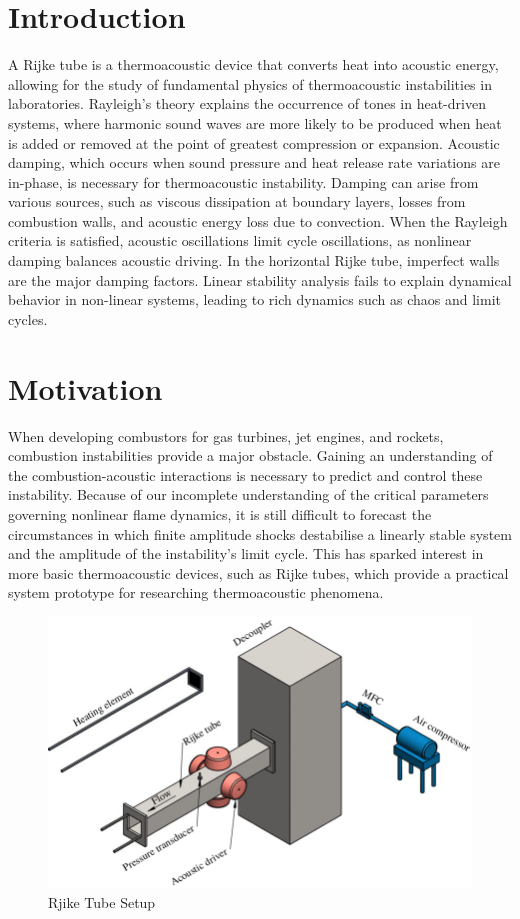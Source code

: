 \documentclass[8pt]{article} %
\begin{document}
\section{Introduction}
A Rijke tube is a thermoacoustic device that converts heat into acoustic energy, allowing for the study of fundamental physics of thermoacoustic instabilities in laboratories. Rayleigh's theory explains the occurrence of tones in heat-driven systems, where harmonic sound waves are more likely to be produced when heat is added or removed at the point of greatest compression or expansion. Acoustic damping, which occurs when sound pressure and heat release rate variations are in-phase, is necessary for thermoacoustic instability. Damping can arise from various sources, such as viscous dissipation at boundary layers, losses from combustion walls, and acoustic energy loss due to convection. When the Rayleigh criteria is satisfied, acoustic oscillations limit cycle oscillations, as nonlinear damping balances acoustic driving. In the horizontal Rijke tube, imperfect walls are the major damping factors. Linear stability analysis fails to explain dynamical behavior in non-linear systems, leading to rich dynamics such as chaos and limit cycles.

\section{Motivation}
When developing combustors for gas turbines, jet engines, and rockets, combustion instabilities provide a major obstacle. Gaining an understanding of the combustion-acoustic interactions is necessary to predict and control these instability. Because of our incomplete understanding of the critical parameters governing nonlinear flame dynamics, it is still difficult to forecast the circumstances in which finite amplitude shocks destabilise a linearly stable system and the amplitude of the instability's limit cycle. This has sparked interest in more basic thermoacoustic devices, such as Rijke tubes, which provide a practical system prototype for researching thermoacoustic phenomena.
\begin{figure}[H]
    \centering
    \includegraphics[width=0.5\linewidth]{setup}
    \caption{Rjike Tube Setup}
    \label{fig:setup}
\end{figure}
\end{document}
